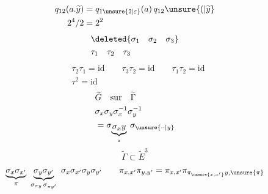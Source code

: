 \[
\begin{aligned}
q_{12}(a.\widetilde y)&=q_{1\unsure{2|\varepsilon}}(a)\,q_{12}\unsure{(|\widetilde y}\\
2^4/2&=2^2
\end{aligned}
\]
\[
\begin{aligned}
&\deleted{\sigma_1\quad\sigma_2\quad\sigma_3}\\
&\tau_1\quad\tau_2\quad\tau_3
\end{aligned}
\]
\[
\begin{aligned}
&\tau_2\tau_1=\mathrm{id}\qquad\tau_3\tau_2=\mathrm{id}\qquad\tau_1\tau_{2}=\mathrm{id}\\
&\tau^2=\mathrm{id}
\end{aligned}
\]
\[
\begin{aligned}
&\widetilde G\quad\text{sur}\quad\widetilde\Gamma\\
&\sigma_x\sigma_y\sigma_x^{-1}\sigma_y^{-1}\\
&=\sigma_{\underbrace{\sigma_x y}_{z}}\ \sigma_{\unsure{\cdot\cdot|y}}
\end{aligned}
\]
\[
\widetilde\Gamma\subset\widetilde E^3
\]
\[
\underbrace{\sigma_x\sigma_{x'}}_{\pi}\ \underbrace{\sigma_y\sigma_{y'}}_{\sigma_{\pi y}\,\sigma_{\pi y'}}\
\sigma_x\sigma_{x'}\sigma_y\sigma_{y'}\qquad
\pi_{x,x'}\pi_{y,y'}=\pi_{x,x'}\pi_{\pi_{\unsure{x,x'}}y,\unsure{\pi}}
\]
